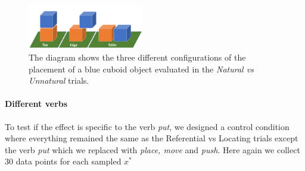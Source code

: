\begin{figure}[h!]
    \centering
    \includegraphics[width=0.45\textwidth, trim={0 0 0 0.7in},clip ] {figures/topedgetable.png}
    \caption{
    The diagram shows the three different configurations of the placement of a blue cuboid object evaluated in the \textit{Natural vs Unnatural} trials. 
    }
    \label{fig:topedgetable}
\end{figure}

\paragraph{Different verbs}  
To test if the effect is specific to the verb \textit{put}, we designed a control condition where everything remained the same as the Referential vs Locating trials except the verb \textit{put} which we replaced with \textit{place, move} and \textit{push}. Here again we collect 30 data points for each sampled $x^*$

